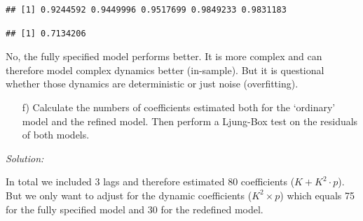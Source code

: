 \documentclass[12pt,a4paper]{article}
\newenvironment{Shaded}{\begin{snugshade}}{\end{snugshade}}
\newcommand{\CommentTok}[1]{\textcolor[rgb]{0.56,0.35,0.01}{\textit{#1}}}
\newcommand{\DataTypeTok}[1]{\textcolor[rgb]{0.13,0.29,0.53}{#1}}
\newcommand{\DecValTok}[1]{\textcolor[rgb]{0.00,0.00,0.81}{#1}}
\newcommand{\FloatTok}[1]{\textcolor[rgb]{0.00,0.00,0.81}{#1}}
\newcommand{\KeywordTok}[1]{\textcolor[rgb]{0.13,0.29,0.53}{\textbf{#1}}}
\newcommand{\NormalTok}[1]{#1}
\newcommand{\OperatorTok}[1]{\textcolor[rgb]{0.81,0.36,0.00}{\textbf{#1}}}
\newcommand{\StringTok}[1]{\textcolor[rgb]{0.31,0.60,0.02}{#1}}
\begin{document}
\begin{verbatim}
## [1] 0.9244592 0.9449996 0.9517699 0.9849233 0.9831183
\end{verbatim}

\begin{Shaded}
\end{Shaded}

\begin{verbatim}
## [1] 0.7134206
\end{verbatim}

No, the fully specified model performs better. It is more complex and
can therefore model complex dynamics better (in-sample). But it is
questional whether those dynamics are deterministic or just noise
(overfitting).

\begin{itemize}
  \item[f)]  Calculate the numbers of coefficients estimated both for the ‘ordinary’ model and the refined model. Then perform a Ljung-Box test on the residuals of both models.
\end{itemize}

\emph{Solution:}

In total we included 3 lags and therefore estimated 80 coefficients
(\(K + K^2 \cdot p\)). But we only want to adjust for the dynamic
coefficients (\(K^2 \times p\)) which equals 75 for the fully specified
model and 30 for the redefined model.

\begin{Shaded}
\end{Shaded}
\end{document}
